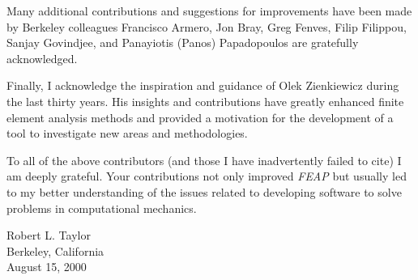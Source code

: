 Many additional contributions and suggestions for improvements
have been made by Berkeley colleagues
Francisco Armero, Jon Bray, Greg Fenves, Filip Filippou, Sanjay Govindjee, and
Panayiotis (Panos) Papadopoulos are gratefully acknowledged.

Finally, I acknowledge the inspiration and guidance of Olek Zienkiewicz during
the last thirty years.  His insights and contributions have greatly enhanced
finite element analysis methods and provided a motivation for the development
of a tool to investigate new areas and methodologies.

To all of the above contributors (and those I have inadvertently failed to
cite) I am deeply grateful.  Your contributions not only improved {\sl FEAP} but
usually led to my better understanding of the issues related to
developing software to solve problems in computational mechanics.

\vspace{0.2in}
\noindent
Robert L. Taylor \\
Berkeley, California \\
August 15, 2000


